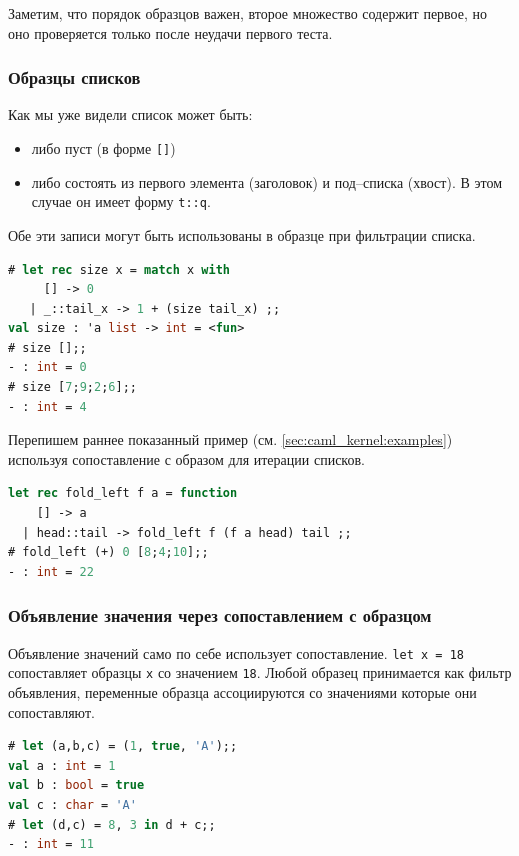Заметим, что порядок образцов важен, второе множество содержит первое, но оно
проверяется только после неудачи первого теста.

\subsubsection{Образцы списков}

Как мы уже видели список может быть:
\begin{itemize}
	\item либо пуст (в форме \texttt{[]})

	\item либо состоять из первого элемента (заголовок) и под–списка (хвост). В
этом случае он имеет форму \texttt{t::q}.
\end{itemize}

Обе эти записи могут быть использованы в образце при фильтрации списка.

\begin{lstlisting}[language=OCaml]
# let rec size x = match x with
     [] -> 0
   | _::tail_x -> 1 + (size tail_x) ;;
val size : 'a list -> int = <fun>
# size [];;
- : int = 0
# size [7;9;2;6];;
- : int = 4
\end{lstlisting}

Перепишем раннее показанный пример (см. \ref{sec:caml_kernel:examples})
используя сопоставление с образом для итерации списков.

\label{sec:caml_kernel:examples:lstlisting}

\begin{lstlisting}[language=OCaml]
let rec fold_left f a = function
    [] -> a
  | head::tail -> fold_left f (f a head) tail ;;
# fold_left (+) 0 [8;4;10];;
- : int = 22
\end{lstlisting}

\subsubsection{Объявление значения через сопоставлением с образцом}

Объявление значений само по себе использует сопоставление. \texttt{let x = 18}
сопоставляет образцы \texttt{x} со значением \texttt{18}. Любой образец
принимается как фильтр объявления, переменные образца ассоциируются со
значениями которые они сопоставляют.

\begin{lstlisting}[language=OCaml]
# let (a,b,c) = (1, true, 'A');;
val a : int = 1
val b : bool = true
val c : char = 'A'
# let (d,c) = 8, 3 in d + c;;
- : int = 11
\end{lstlisting}

